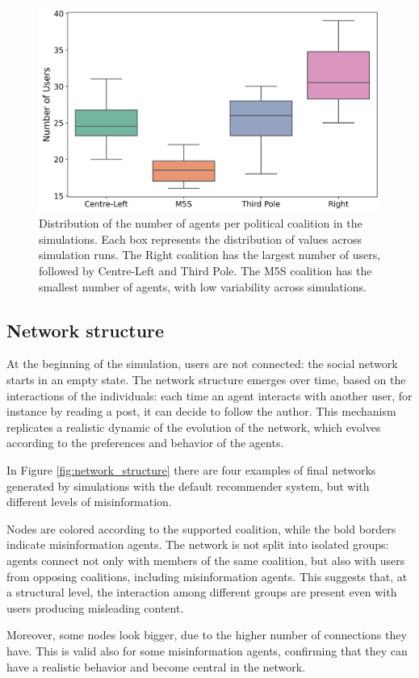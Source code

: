 \begin{figure}[h]
    \centering
    \includegraphics[width=0.6\linewidth]{Images/Network/population_composition_DefaultRecSys.png}
    \caption{Distribution of the number of agents per political coalition in the simulations.
    Each box represents the distribution of values across simulation runs.
    The Right coalition has the largest number of users, followed by Centre-Left and Third Pole.
    The M5S coalition has the smallest number of agents, with low variability across simulations.}
    \label{fig:population}
\end{figure}


\subsection{Network structure}
At the beginning of the simulation, users are not connected: the social network starts in an empty state.
The network structure emerges over time, based on the interactions of the individuals: each time an agent interacts with another user, for instance by reading a post, it can decide to follow the author.
This mechanism replicates a realistic dynamic of the evolution of the network, which evolves according to the preferences and behavior of the agents.

\medskip
In Figure \ref{fig:network_structure} there are four examples of final networks generated by simulations with the default recommender system, but with different levels of misinformation.

Nodes are colored according to the supported coalition, while the bold borders indicate misinformation agents.
The network is not split into isolated groups: agents connect not only with members of the same coalition, but also with users from opposing coalitions, including misinformation agents.
This suggests that, at a structural level, the interaction among different groups are present even with users producing misleading content.

Moreover, some nodes look bigger, due to the higher number of connections they have.
This is valid also for some misinformation agents, confirming that they can have a realistic behavior and become central in the network.

